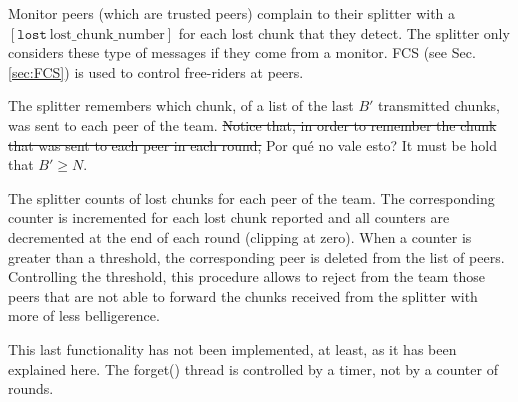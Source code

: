 

\label{sec:free_riding_control}

Monitor peers (which are trusted peers) complain to their splitter
with a $[\mathtt{lost}~\text{lost\_chunk\_number}]$ for each lost
chunk that they detect. The splitter only considers these type of
messages if they come from a monitor. FCS (see Sec. \ref{sec:FCS}) is
used to control free-riders at peers.

The splitter remembers which chunk, of a list of the last $B'$
transmitted chunks, was sent to each  peer of the team. \st{Notice that, in
order to remember the chunk that was sent to each peer in each round,} {\color{red} Por qué no vale esto?}
It must be hold that $B'\ge N$. 

The splitter counts of lost chunks for each peer of the team. The
corresponding counter is incremented for each lost chunk reported and
all counters are decremented at the end of each round (clipping at
zero). When a counter is greater than a threshold, the corresponding
peer is deleted from the list of peers. Controlling the threshold,
this procedure allows to reject from the team those peers that are not
able to forward the chunks received from the splitter with more of
less belligerence.


\begin{notex}
This last functionality has not been implemented, at least, as it has
been explained here. The forget() thread is controlled by a timer, not
by a counter of rounds.
\end{notex}

